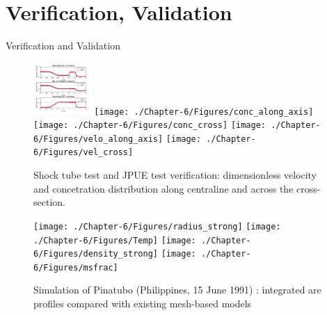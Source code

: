 \documentclass{beamer}
\begin{document}
\section{Verification, Validation}
\begin{frame}{Verification and Validation}
\begin{figure}
\flushleft
\includegraphics[width=0.195\textwidth]{./PPT/shocktube}
\hfill
\texttt{[image: ./Chapter-6/Figures/conc\_along\_axis]}
\hfill
\texttt{[image: ./Chapter-6/Figures/conc\_cross]}
\hfill
\texttt{[image: ./Chapter-6/Figures/velo\_along\_axis]}
\hfill
\texttt{[image: ./Chapter-6/Figures/vel\_cross]}
\caption{Shock tube test and JPUE test verification: dimensionless velocity and concetration distribution along centraline and across the cross-section.}
\label{fig:JPUE_all}
\end{figure}
%
\begin{figure}
\flushleft
\texttt{[image: ./Chapter-6/Figures/radius\_strong]}
\hfill
\texttt{[image: ./Chapter-6/Figures/Temp]}
\hfill
\texttt{[image: ./Chapter-6/Figures/density\_strong]}
\hfill
\texttt{[image: ./Chapter-6/Figures/msfrac]}
\caption{Simulation of Pinatubo (Philippines, 15 June 1991) : integrated are profiles compared with existing mesh-based models}
\label{fig:JPUE_all}
\end{figure}
\end{frame}
\end{document}
